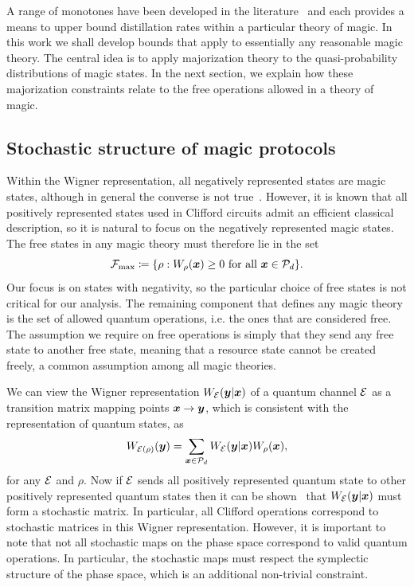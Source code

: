 \documentclass[pra,
aps,
twocolumn,
superscriptaddress,
groupedaddress,
nofootinbib,
reprint
]{revtex4-1}
\begin{document}
A range of monotones have been developed in the literature~\cite{cit:howard, Wang_2020, Seddon_2021} and each provides a means to upper bound distillation rates within a particular theory of magic. In this work we shall develop bounds that apply to essentially any reasonable magic theory. The central idea is to apply majorization theory to the quasi-probability distributions of magic states. In the next section, we explain how these majorization constraints relate to the free operations allowed in a theory of magic.



\subsection{Stochastic structure of magic protocols}
\label{sec:struc}

Within the Wigner representation, all negatively represented states are magic states, although in general the converse is not true~\cite{cit:campbell}. However, it is known that all positively represented states used in Clifford circuits admit an efficient classical description, so it is natural to focus on the negatively represented magic states. The free states in any magic theory must therefore lie in the set
\begin{equation}
    \Fmax \coloneqq \{ \rho: \W[\bmx]{\rho} \geq 0 \text{ for all } \bmx \in \cal{P}_d\}.
\end{equation}
Our focus is on states with negativity, so the particular choice of free states is not critical for our analysis. The remaining component that defines any magic theory is the set of allowed quantum operations, i.e. the ones that are considered free. The assumption we require on free operations is simply that they send any free state to another free state, meaning that a resource state cannot be created freely, a common assumption among all magic theories.

We can view the Wigner representation $W_{{\mathcal E}}( \boldsymbol{y} | \boldsymbol{x})$ of a quantum channel ${\mathcal E}$ as a transition matrix mapping points $\boldsymbol{x} \rightarrow \boldsymbol{y}$, which is consistent with the representation of quantum states, as
\begin{equation}
	W_{{\mathcal E}(\rho)} (\boldsymbol{y}) = \sum_{\boldsymbol{x} \in {\mathcal P}_d} W_{{\mathcal E}}( \boldsymbol{y} | \boldsymbol{x}) W_\rho(\boldsymbol{x}),
\end{equation}
for any ${\mathcal E}$ and $\rho$. Now if ${\mathcal E}$ sends all positively represented quantum state to other positively represented quantum states then it can be shown~\cite{Wang_2019} that $W_{{\mathcal E}}(\boldsymbol{y} |\boldsymbol{x})$ must form a stochastic matrix. In particular, all Clifford operations correspond to stochastic matrices in this Wigner representation. However, it is important to note that not all stochastic maps on the phase space correspond to valid quantum operations. In particular, the stochastic maps must respect the symplectic structure of the phase space, which is an additional non-trivial constraint.
\end{document}
